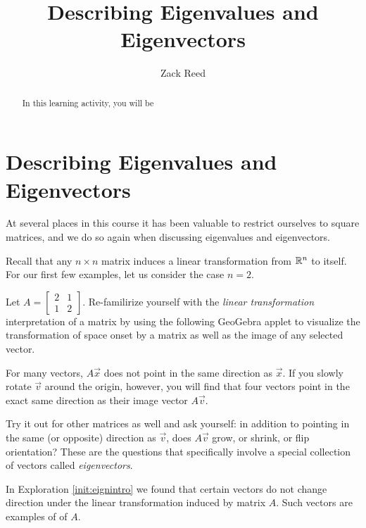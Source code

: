 \documentclass{ximera}
\author{Zack Reed}
\title{Describing Eigenvalues and Eigenvectors}
\begin{document}
\begin{abstract}

    In this learning activity, you will be 
\end{abstract}
\maketitle


\section*{Describing Eigenvalues and Eigenvectors}

    
At several places in this course it has been valuable to restrict ourselves to square matrices, and we do so again when discussing eigenvalues and eigenvectors. 
    
Recall that any $n \times n$  matrix induces a linear transformation from $\mathbb{R}^n$ to itself.  For our first few examples, let us consider the case $n = 2$.
    
\begin{exploration}\label{init:eignintro}
Let $A=\begin{bmatrix} 2& 1\\ 1&2
\end{bmatrix}$. Re-familirize yourself with the \emph{linear transformation} interpretation of a matrix by using the following GeoGebra applet to visualize the transformation of space onset by a matrix as well as the image of any selected vector. 

\begin{center}
\end{center}
    
    For many vectors, $A\vec{x}$ does not point in the same direction as $\vec{x}$. If you slowly rotate $\vec{v}$ around the origin, however, you will find that four vectors point in the exact same direction as their image vector $A\vec{v}$.

    Try it out for other matrices as well and ask yourself: in addition to pointing in the same (or opposite) direction as $\vec{v}$, does $A\vec{v}$ grow, or shrink, or flip orientation? These are the questions that specifically involve a special collection of vectors called \emph{eigenvectors}.
    

\end{exploration}
    
In Exploration \ref{init:eignintro} we found that certain vectors do not change direction under the linear transformation induced by matrix $A$.  Such vectors are examples of  of $A$.
    
\end{document}
